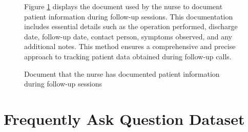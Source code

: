 \documentclass[12pt,oneside,openright,a4paper]{cpe-english-project}
\begin{document}
      \begin{figure}
        \centering
        \caption{Document that the nurse has documented patient information during follow-up sessions}\label{fig:Interview_4}
        \begin{justify}
          \qquad Figure \ref{fig:Interview_4} displays the document used by the nurse to document patient information during follow-up sessions. This documentation includes essential details such as the operation performed, discharge date, follow-up date, contact person, symptoms observed, and any additional notes. This method ensures a comprehensive and precise approach to tracking patient data obtained during follow-up calls. \par
        \end{justify}
      \end{figure}
    
\clearpage   
  \section{Frequently Ask Question Dataset}
\end{document}

